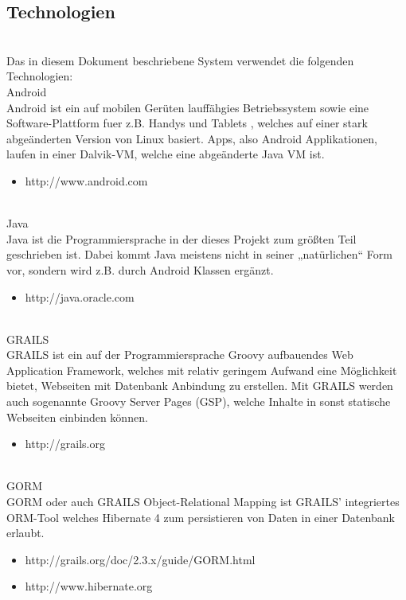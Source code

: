 \subsection{Technologien}\\
Das in diesem Dokument beschriebene System verwendet die folgenden Technologien:\\
Android\\
Android ist ein auf mobilen Gerüten lauffähgies Betriebssystem sowie eine Software-Plattform fuer z.B. Handys und Tablets , welches auf einer stark abgeänderten Version von Linux basiert. Apps, also Android Applikationen, laufen in einer Dalvik-VM, welche eine abgeänderte Java VM ist.\\
\begin{itemize}\\
\item http://www.android.com\\
\end{itemize}\\
Java\\
Java ist die Programmiersprache in der dieses Projekt zum größten Teil geschrieben ist. Dabei kommt Java meistens nicht in seiner „natürlichen“ Form vor, sondern wird z.B. durch Android Klassen ergänzt.\\
\begin{itemize}
\item http://java.oracle.com\\
\end{itemize}\\
GRAILS\\
GRAILS ist ein auf der Programmiersprache Groovy aufbauendes Web Application Framework, welches mit relativ geringem Aufwand eine Möglichkeit bietet, Webseiten mit Datenbank Anbindung zu erstellen. Mit GRAILS werden auch sogenannte Groovy Server Pages (GSP), welche Inhalte in sonst statische Webseiten einbinden können.\\
\begin{itemize}
\item http://grails.org\\
\end{itemize}\\
GORM\\
GORM oder auch GRAILS Object-Relational Mapping ist GRAILS' integriertes ORM-Tool welches Hibernate 4 zum persistieren von Daten in einer Datenbank erlaubt.\\
\begin{itemize}
\item http://grails.org/doc/2.3.x/guide/GORM.html\\
\item http://www.hibernate.org\\
\end{itemize}\\
